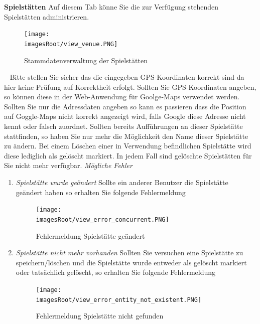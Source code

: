 \documentclass[11pt, a4paper, twoside]{article}   	%
\newcommand{\imagesRoot}{images}
\begin{document}
\newpage
\textbf{Spielstätten}
\newline
Auf diesem Tab könne Sie die zur Verfügung stehenden Spielstätten administrieren.
	\begin{figure}[h]
	\centering
	\texttt{[image: \\imagesRoot/view\_venue.PNG]}
	\caption
	{Stammdatenverwaltung der Spielstätten}
\end{figure}
\ \newline
Bitte stellen Sie sicher das die eingegeben GPS-Koordinaten korrekt sind da hier keine Prüfung auf Korrektheit erfolgt. Sollten Sie GPS-Koordinaten angeben, so können diese in der  Web-Anwendung für Goolge-Maps verwendet werden. Sollten Sie nur die Adressdaten angeben so kann es passieren dass die Position auf Goggle-Maps nicht korrekt angezeigt wird, falls Google diese Adresse nicht kennt oder falsch zuordnet.
\newline
\newline
Sollten bereits Aufführungen an dieser Spielstätte stattfinden, so haben Sie nur mehr die Möglichkeit den Name dieser Spielstätte zu ändern. Bei einem Löschen einer in Verwendung befindlichen Spielstätte wird diese lediglich als gelöscht markiert. In jedem Fall sind gelöschte Spielstätten für Sie nicht mehr verfügbar.
\newline
\newline
\emph{Mögliche Fehler}
\begin{enumerate}
\item\emph{Spielstätte wurde geändert}
\newline
Sollte ein anderer Benutzer die Spielstätte geändert haben so erhalten Sie folgende Fehlermeldung
	\begin{figure}[h]
	\centering
	\texttt{[image: \\imagesRoot/view\_error\_concurrent.PNG]}
	\caption
	{Fehlermeldung Spielstätte geändert}
\end{figure}
\item\emph{Spielstätte nicht mehr vorhanden}
\newline
Sollten Sie versuchen eine Spielstätte zu speichern/löschen und die Spielstätte wurde entweder als gelöscht markiert oder tatsächlich gelöscht, so erhalten Sie folgende Fehlermeldung
	\begin{figure}[h]
	\centering
	\texttt{[image: \\imagesRoot/view\_error\_entity\_not\_existent.PNG]}
	\caption
	{Fehlermeldung Spielstätte nicht gefunden}
\end{figure}	
\end{enumerate}
\end{document}
